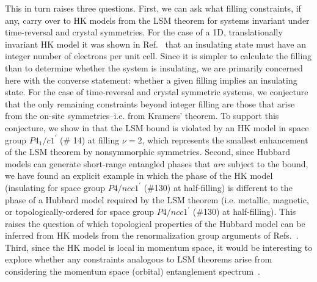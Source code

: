 \documentclass[prb,aps,amssymb,twocolumn,notitlepage]{revtex4-2}
\begin{document}
This in turn raises three questions. 
First, we can ask what filling constraints, if any, carry over to HK models from the LSM theorem for systems invariant under time-reversal and crystal symmetries. 
For the case of a 1D, translationally invariant HK model it was shown in Ref.~\cite{lsmyin2022} that an insulating state must have an integer number of electrons per unit cell. Since it is simpler to calculate the filling than to determine whether the system is insulating, we are primarily concerned here with the converse statement: whether a given filling implies an insulating state.
For the case of time-reversal and crystal symmetric systems, we conjecture that the only remaining constraints beyond integer filling are those that arise from the on-site symmetries--i.e. from Kramers' theorem. 
To support this conjecture, we show in  that the LSM bound is violated by an HK model in space group $P4_1/c1^\prime$ (\# 14) at filling $\nu=2$, which represents the smallest enhancement of the LSM theorem by nonsymmorphic symmetries. 
Second, since Hubbard models can generate short-range entangled phases that \textit{are} subject to the bound, we have found an explicit example in which the phase of the HK model (insulating for space group $P4/ncc1^\prime$ (\#130) at half-filling) is different to the phase of a Hubbard model required by the LSM theorem (i.e. metallic, magnetic, or topologically-ordered for space group $P4/ncc1^\prime$ (\#130) at half-filling). 
This raises the question of which topological properties of the Hubbard model can be inferred from HK models from the renormalization group arguments of Refs.~\cite{2022Philipuniversalityargument,zhao2023proof}. 
Third, since the HK model is local in momentum space, it would be interesting to explore whether any constraints analogous to LSM theorems arise from considering the momentum space (orbital) entanglement spectrum~\cite{li2008entanglement,chandran2011bulk}.
\end{document}
